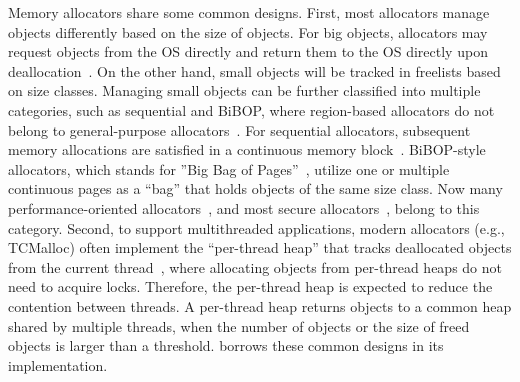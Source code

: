 Memory allocators share some common designs. First, most allocators manage objects differently based on the size of objects. For big objects, allocators may request objects from the OS directly and return them to the OS directly upon deallocation~\cite{Hoard}. On the other hand, small objects will be tracked in freelists based on size classes. Managing small objects can be further classified into multiple categories, such as sequential and BiBOP, where region-based allocators do not belong to general-purpose allocators~\cite{DieHarder, Gay:1998:MME:277650.277748}. 
For sequential allocators, subsequent memory allocations are satisfied in a continuous memory block~\cite{Cling}. BiBOP-style allocators, which stands for ''Big Bag of Pages''~\cite{hanson1980portable}, utilize one or multiple continuous pages as a ``bag'' that holds objects of the same size class. 
Now many performance-oriented allocators~\cite{tcmalloc, jemalloc, Scalloc}, and most secure allocators~\cite{openbsd, DieHarder, FreeGuard, Guarder}, belong to this category. Second, to support multithreaded applications, modern allocators (e.g., TCMalloc) often implement the ``per-thread heap'' that tracks deallocated objects from the current thread~\cite{tcmallocnew}, where allocating objects from per-thread heaps do not need to acquire locks. Therefore, the per-thread heap is expected to reduce the contention between threads. A per-thread heap returns objects to a common heap shared by multiple threads, when the number of objects or the size of freed objects is larger than a threshold. \NM{} borrows these common designs in its implementation. 

 
